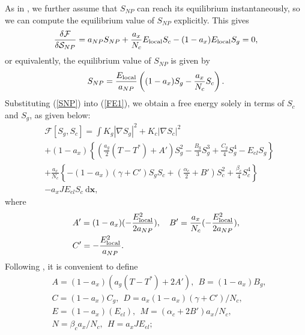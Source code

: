 \documentclass[reprint,amsfonts,amsmath,amssymb,aps,pre,floatfix,10pt]{revtex4-1}
\newcommand\dd{\mathrm{d}}
\newcommand\x{\mathbf{x}}
\begin{document}
 As in \cite{lopatina2009theory_13}, we further assume that $S_{NP}$ can reach its equilibrium instantaneously, so we can compute the equilibrium value of $S_{NP}$ explicitly. This gives
\begin{equation}
\frac{\delta \mathcal{F}}{\delta \mathcal{S}_{NP}} = a_{NP} S_{NP} + \frac{a_x}{N_c} E_{\rm local} S_c - (1 - a_x) E_{\rm local} S_g = 0,
\end{equation}
or equivalently, the equilibrium value of $S_{NP}$ is given by
\begin{equation}\label{SNP}
S_{NP} =  \frac{E_{\rm local}}{a_{NP}} \left( (1 - a_x) S_g - \frac{a_x}{ N_c } S_c \right).
\end{equation}
Substituting (\ref{SNP}) into (\ref{FE1}), we obtain a free energy solely in terms of $S_c$ and $S_g$, as given below:
\begin{equation}
  \begin{aligned}
  & \mathcal{F}[S_g, S_c] = \int K_g\left|\nabla S_g\right|^2 +K_c\left|\nabla S_c\right|^2 \\
  & +\left(1-a_x\right)\left\{ (\tfrac{a_g}{2}\left(T-T^*\right) + A') S_g^2-\tfrac{B_g}{3} S_g^3+\tfrac{C_g}{4} S_g^4-E_{e l} S_g\right\} \\ &+\tfrac{a_x}{N_c}\left\{-\left(1-a_x\right) (\gamma + C') S_g S_c + (\tfrac{\alpha_c}{2} + B') S_c^2+\tfrac{\beta_c}{4} S_c^4\right\} \\
  & -a_x J E_{e l} S_c ~ \dd \x,
  \end{aligned}
\end{equation}
where
\begin{equation}
  \begin{aligned}
    & A' = (1 - a_x) (- \frac{E_{\rm local}^2}{2 a_{NP}}), \quad B' =  \frac{a_x}{N_c} (- \frac{E_{\rm local}^2}{2 a_{NP}}), \\
    & C' = - \frac{E_{\rm local}^2}{a_{NP}}. \\
  \end{aligned}
\end{equation} %
Following \cite{patranabish2019one_37}, it is convenient to define
\begin{equation}
  \begin{aligned}
  & A = (1 -  a_x) ( a_g (T - T^*) + 2 A'),~~ B = (1 -  a_x) B_g,\\
  & C = (1 -  a_x) C_g,~~ D = a_x  (1 -  a_x) (\gamma + C') / N_c,  \\
  & E = (1 -  a_x) (E_{el}), ~~ M = (\alpha_c + 2 B') a_x / N_c, \\
  & N = \beta_c a_x / N_c, ~~ H =  a_x J E_{el};  \\
  \end{aligned}
\end{equation} 
\end{document}
